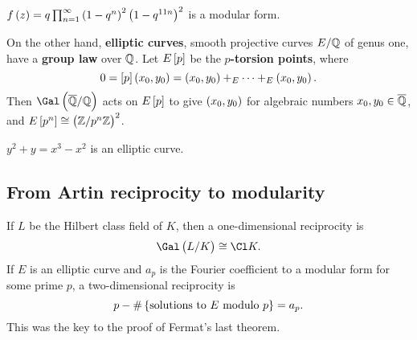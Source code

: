 \begin{example*}
$ f\br{z} = q\prod_{n = 1}^\infty \br{1 - q^n}^2\br{1 - q^{11n}}^2 $ is a modular form.
\end{example*}

On the other hand, \textbf{elliptic curves}, smooth projective curves $ E / \mathbb{Q} $ of genus one, have a \textbf{group law} over $ \mathbb{Q} $. Let $ E\sbr{p} $ be the \textbf{$ p $-torsion points}, where
$$ 0 = \sbr{p}\br{x_0, y_0} = \br{x_0, y_0} +_E \dots +_E \br{x_0, y_0}. $$
Then $ \Gal\br{\overline{\QQ} / \QQ} $ acts on $ E\sbr{p} $ to give $ \br{x_0, y_0} $ for algebraic numbers $ x_0, y_0 \in \overline{\mathbb{Q}} $, and $ E\sbr{p^n} \cong \br{\ZZ / p^n\ZZ}^2 $.

\begin{example*}
$ y^2 + y = x^3 - x^2 $ is an elliptic curve.
\end{example*}

\subsection{From Artin reciprocity to modularity}

If $ L $ be the Hilbert class field of $ K $, then a one-dimensional reciprocity is
$$ \Gal\br{L / K} \cong \Cl K. $$
If $ E $ is an elliptic curve and $ a_p $ is the Fourier coefficient to a modular form for some prime $ p $, a two-dimensional reciprocity is
$$ p - \#\cbr{\text{solutions to} \ E \ \text{modulo} \ p} = a_p. $$
This was the key to the proof of Fermat's last theorem.


